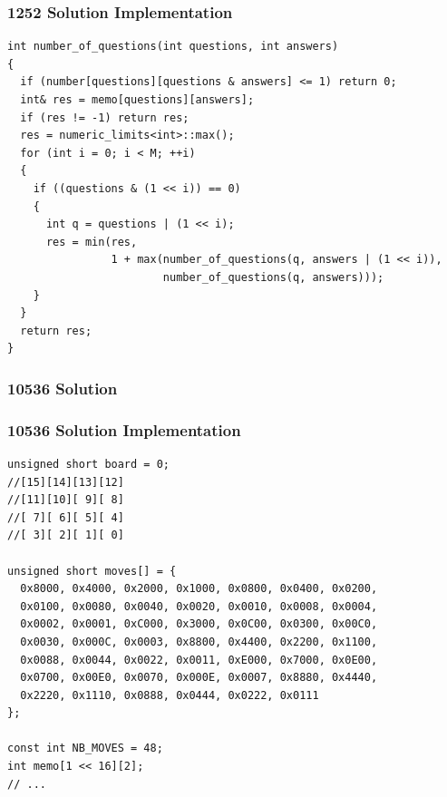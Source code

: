 \documentclass{beamer}
\newcommand{\uvalink}[2]{UVa Online Judge (http://uva.onlinejudge.org)
  problem number \href{#2}{\textcolor{blue}{#1}.}}
\newcounter{exo}
\newcommand{\exo}{
  \addtocounter{exo}{1}
  Exercice \arabic{exo}
}
\begin{document}
\begin{frame}[fragile]
\frametitle{1252 Solution Implementation}

\scriptsize
\begin{lstlisting}
int number_of_questions(int questions, int answers)
{
  if (number[questions][questions & answers] <= 1) return 0;
  int& res = memo[questions][answers];
  if (res != -1) return res;
  res = numeric_limits<int>::max();
  for (int i = 0; i < M; ++i)
  {
    if ((questions & (1 << i)) == 0)
    {
      int q = questions | (1 << i);
      res = min(res,
                1 + max(number_of_questions(q, answers | (1 << i)),
                        number_of_questions(q, answers)));
    }
  }
  return res;
}
\end{lstlisting}

\end{frame}

\fi


\ifanswers

\begin{frame}%
\frametitle{10536 Solution}

\end{frame}

\begin{frame}[fragile]
\frametitle{10536 Solution Implementation}

\scriptsize
\begin{lstlisting}
unsigned short board = 0;
//[15][14][13][12]
//[11][10][ 9][ 8]
//[ 7][ 6][ 5][ 4]
//[ 3][ 2][ 1][ 0]

unsigned short moves[] = {
  0x8000, 0x4000, 0x2000, 0x1000, 0x0800, 0x0400, 0x0200,
  0x0100, 0x0080, 0x0040, 0x0020, 0x0010, 0x0008, 0x0004,
  0x0002, 0x0001, 0xC000, 0x3000, 0x0C00, 0x0300, 0x00C0,
  0x0030, 0x000C, 0x0003, 0x8800, 0x4400, 0x2200, 0x1100,
  0x0088, 0x0044, 0x0022, 0x0011, 0xE000, 0x7000, 0x0E00,
  0x0700, 0x00E0, 0x0070, 0x000E, 0x0007, 0x8880, 0x4440,
  0x2220, 0x1110, 0x0888, 0x0444, 0x0222, 0x0111
};

const int NB_MOVES = 48;
int memo[1 << 16][2];
// ...
\end{lstlisting}

\end{frame}
\end{document}
